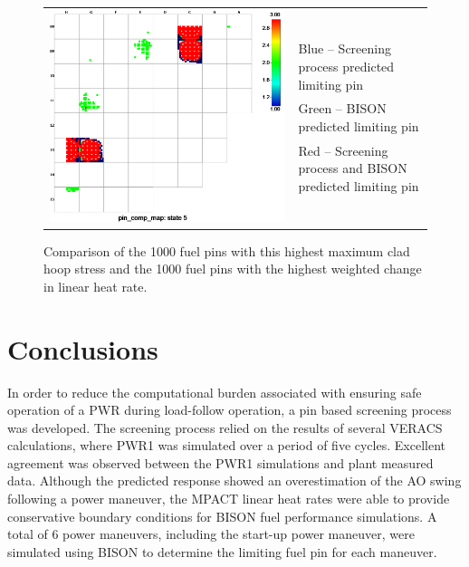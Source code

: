 \documentclass[edeposit,fullpage,11pt]{uiucthesis2009}
\begin{document}
\begin{center}
\begin{figure}[h]
\begin{tabular}{ll}
\multirow{ 15}{*}{\includegraphics[trim={0 0 4.5cm 0},clip,width=0.4\linewidth]{./Figures/screening/comp5.png}} &  \\
&\\
&\\  
&\\
&\\
&\\
&Blue -- Screening process predicted limiting pin\\
&Green -- BISON predicted limiting pin\\
&Red -- Screening process and BISON predicted limiting pin\\
&\\
&\\
&\\
&\\
&\\
&\\
\end{tabular}
\caption{Comparison of the 1000 fuel pins with this highest maximum clad hoop stress and the 1000 fuel pins with the highest weighted change in linear heat rate.}
\label{fig:comp}
\end{figure}
\end{center}
\chapter{Conclusions}

In order to reduce the computational burden associated with ensuring safe operation of a \gls{PWR} during load-follow operation, a pin based screening process was developed.
The screening process relied on the results of several \gls{VERACS} calculations, where PWR1 was simulated over a period of five cycles.
Excellent agreement was observed between the PWR1 simulations and plant measured data.
Although the predicted response showed an overestimation of the \gls{AO} swing following a power maneuver, the MPACT linear heat rates were able to provide conservative boundary conditions for BISON fuel performance simulations.
A total of 6 power maneuvers, including the start-up power maneuver, were simulated using BISON to determine the limiting fuel pin for each maneuver.
\end{document}
